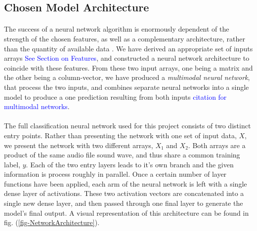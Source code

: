 \documentclass[12pt,letterpaper]{article}
\begin{document}

\subsection{Chosen Model Architecture}
\label{sec-Architecture}

\paragraph*{}The success of a neural network algorithm is enormously dependent of the strength of the chosen features, as well as a complementary architecture, rather than the quantity of available data \cite{Geron,Kahn,Liu}. We have derived an appropriate set of inputs arrays \textcolor{blue}{See Section on Features}, and constructed a neural network architecture to coincide with these features. From these two input arrays, one being a matrix and the other being a column-vector, we have produced a \textit{multimodal neural network}, that process the two inputs, and combines separate neural networks into a single model to produce a one prediction resulting from both inputs \textcolor{blue}{citation for multimodal networks}.

\paragraph*{}The full classification neural network used for this project consists of two distinct entry points. Rather than presenting the network with one set of input data, $X$, we present the network with two different arrays, $X_1$ and $X_2$. Both arrays are a product of the same audio file sound wave, and thus share a common training label, $y$. Each of the two entry layers leads to it's own branch and the given information is process roughly in parallel. Once a certain number of layer functions have been applied, each arm of the neural network is left with a single dense layer of activations. These two activation vectors are concatenated into a single new dense layer, and then passed through one final layer to generate the model's final output. A visual representation of this architecture can be found in fig. (\ref{fig-NetworkArchitecture}).
\end{document}
